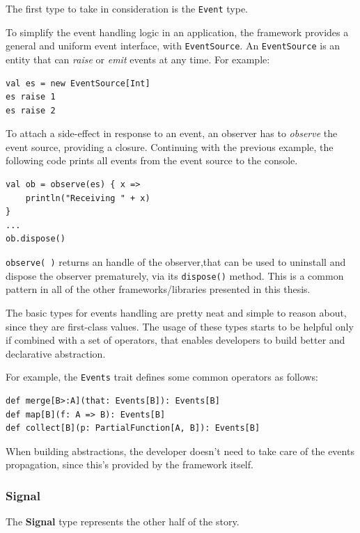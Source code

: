 The first type to take in consideration is the \texttt{Event} type.

To simplify the event handling logic in an application, the framework
provides a general and uniform event interface, with
\texttt{EventSource}. An \texttt{EventSource} is an entity that can
\emph{raise} or \emph{emit} events at any time. For example:

\begin{verbatim}
val es = new EventSource[Int]
es raise 1
es raise 2
\end{verbatim}

To attach a side-effect in response to an event, an observer has to
\emph{observe} the event source, providing a closure. Continuing with
the previous example, the following code prints all events from the
event source to the console.

\begin{verbatim}
val ob = observe(es) { x =>
    println("Receiving " + x)
}
...
ob.dispose()
\end{verbatim}

\texttt{observe(\ )} returns an handle of the observer,that can be used
to uninstall and dispose the observer prematurely, via its
\texttt{dispose()} method. This is a common pattern in all of the other
frameworks/libraries presented in this thesis.

The basic types for events handling are pretty neat and simple to reason
about, since they are first-class values. The usage of these types
starts to be helpful only if combined with a set of operators, that
enables developers to build better and declarative abstraction.

For example, the \texttt{Events} trait defines some common operators as
follows:

\begin{verbatim}
def merge[B>:A](that: Events[B]): Events[B]
def map[B](f: A => B): Events[B]
def collect[B](p: PartialFunction[A, B]): Events[B]
\end{verbatim}

When building abstractions, the developer doesn't need to take care of
the events propagation, since this's provided by the framework itself.

\subsubsection{Signal}\label{signal}

The \textbf{Signal} type represents the other half of the story.

